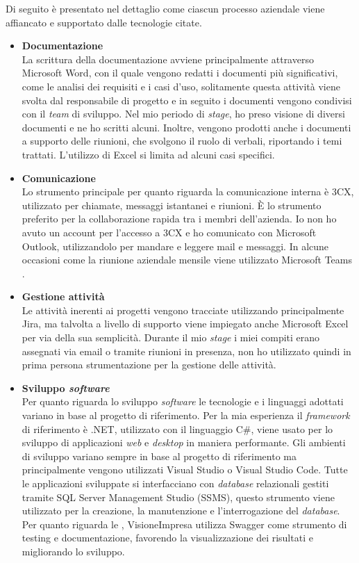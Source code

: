 Di seguito è presentato nel dettaglio come ciascun processo aziendale viene affiancato e supportato dalle tecnologie citate.

\begin{itemize}

    \item \textbf{Documentazione} \\
    La scrittura della documentazione avviene principalmente attraverso Microsoft Word, con il quale vengono redatti i documenti più significativi, come le analisi dei requisiti e i casi d'uso, solitamente questa attività viene svolta dal responsabile di progetto e in seguito i documenti vengono condivisi con il \textit{team} di sviluppo. Nel mio periodo di \textit{stage}, ho preso visione di diversi documenti e ne ho scritti alcuni. Inoltre, vengono prodotti anche i documenti a supporto delle riunioni, che svolgono il ruolo di verbali, riportando i temi trattati. L'utilizzo di Excel si limita ad alcuni casi specifici.
    
    \item \textbf{Comunicazione} \\
    Lo strumento principale per quanto riguarda la comunicazione interna è 3CX, utilizzato per chiamate, messaggi istantanei e riunioni. È lo strumento preferito per la collaborazione rapida tra i membri dell'azienda. Io non ho avuto un account per l'accesso a 3CX e ho comunicato con Microsoft Outlook, utilizzandolo per mandare e leggere mail e messaggi. In alcune occasioni come la riunione aziendale mensile viene utilizzato Microsoft Teams .


    \item \textbf{Gestione attività} \\
    Le attività inerenti ai progetti vengono tracciate utilizzando principalmente Jira, ma talvolta a livello di supporto viene impiegato anche Microsoft Excel per via della sua semplicità. Durante il mio \textit{stage} i miei compiti erano assegnati via email o tramite riunioni in presenza, non ho utilizzato quindi in prima persona strumentazione per la gestione delle attività.

    \item \textbf{Sviluppo \textit{software}} \\
    Per quanto riguarda lo sviluppo \textit{software} le tecnologie e i linguaggi adottati variano in base al progetto di riferimento. Per la mia esperienza il \textit{framework} di riferimento è .NET, utilizzato con il linguaggio C\#, viene usato per lo sviluppo di applicazioni \textit{web} e \textit{desktop} in maniera performante. Gli ambienti di sviluppo variano sempre in base al progetto di riferimento ma principalmente vengono utilizzati Visual Studio o Visual Studio Code. Tutte le applicazioni sviluppate si interfacciano con \textit{database} relazionali gestiti tramite SQL Server Management Studio (SSMS), questo strumento viene utilizzato per la creazione, la manutenzione e l'interrogazione del \textit{database}.
    Per quanto riguarda le  , VisioneImpresa utilizza Swagger come strumento di testing e documentazione, favorendo la visualizzazione dei risultati e migliorando lo sviluppo.


\end{itemize}

